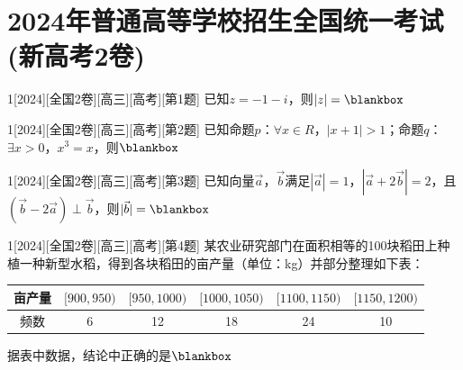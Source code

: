 \section{2024年普通高等学校招生全国统一考试(新高考2卷)}
\begin{example}{1}[2024][全国2卷][高三][高考][第1题]
已知$z=-1-i$，则$|z|=\blankbox$
\begin{choices}
\end{choices}
\end{example}

\begin{example}{1}[2024][全国2卷][高三][高考][第2题]
已知命题$p$：$\forall x\in R$，$|x+1|>1$；命题$q$：$\exists x>0$，$x^3=x$，则$\blankbox$
\begin{choices}
\end{choices}
\end{example}

\begin{example}{1}[2024][全国2卷][高三][高考][第3题]
已知向量$\vec{a}$，$\vec{b}$满足$|\vec{a}|=1$，$|\vec{a}+2\vec{b}|=2$，且$(\vec{b}-2\vec{a})\perp\vec{b}$，则$|\vec{b}|=\blankbox$
\begin{choices}
\end{choices}
\end{example}

\begin{example}{1}[2024][全国2卷][高三][高考][第4题]
某农业研究部门在面积相等的100块稻田上种植一种新型水稻，得到各块稻田的亩产量（单位：kg）并部分整理如下表：
\begin{center}
\begin{tabular}{|c|c|c|c|c|c|}
\hline
亩产量 & $[900,950)$ & $[950,1000)$ & $[1000,1050)$ & $[1100,1150)$ & $[1150,1200)$ \\
\hline
频数 & 6 & 12 & 18 & 24 & 10 \\
\hline
\end{tabular}
\end{center}
据表中数据，结论中正确的是$\blankbox$
\begin{choices}
\end{choices}
\end{example}

